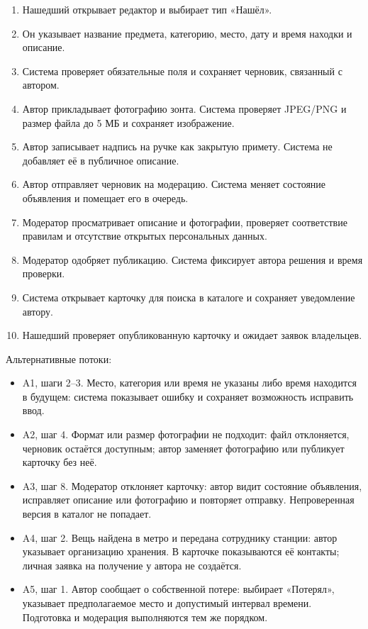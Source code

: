 \begin{enumerate}
\item Нашедший открывает редактор и выбирает тип «Нашёл».
\item Он указывает название предмета, категорию, место, дату и время находки и описание.
\item Система проверяет обязательные поля и сохраняет черновик, связанный с автором.
\item Автор прикладывает фотографию зонта. Система проверяет JPEG/\allowbreak{}PNG и размер файла до 5 МБ и сохраняет изображение.
\item Автор записывает надпись на ручке как закрытую примету. Система не добавляет её в публичное описание.
\item Автор отправляет черновик на модерацию. Система меняет состояние объявления и помещает его в очередь.
\item Модератор просматривает описание и фотографии, проверяет соответствие правилам и отсутствие открытых персональных данных.
\item Модератор одобряет публикацию. Система фиксирует автора решения и время проверки.
\item Система открывает карточку для поиска в каталоге и сохраняет уведомление автору.
\item Нашедший проверяет опубликованную карточку и ожидает заявок владельцев.
\end{enumerate}

Альтернативные потоки:

\begin{itemize}
\item A1, шаги 2–3. Место, категория или время не указаны либо время находится в будущем: система показывает ошибку и сохраняет возможность исправить ввод.
\item A2, шаг 4. Формат или размер фотографии не подходит: файл отклоняется, черновик остаётся доступным; автор заменяет фотографию или публикует карточку без неё.
\item A3, шаг 8. Модератор отклоняет карточку: автор видит состояние объявления, исправляет описание или фотографию и повторяет отправку. Непроверенная версия в каталог не попадает.
\item A4, шаг 2. Вещь найдена в метро и передана сотруднику станции: автор указывает организацию хранения. В карточке показываются её контакты; личная заявка на получение у автора не создаётся.
\item A5, шаг 1. Автор сообщает о собственной потере: выбирает «Потерял», указывает предполагаемое место и допустимый интервал времени. Подготовка и модерация выполняются тем же порядком.
\end{itemize}

